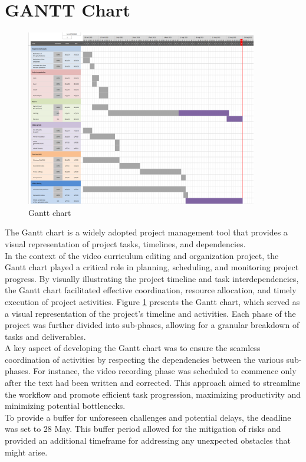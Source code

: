 \documentclass[eng]{class}
\begin{document}
\section{GANTT Chart}
\begin{figure}[b!]
  \centering
  \includegraphics[width=0.9\textwidth]{images/gantt.png}
  \caption{Gantt chart}
  \label{fig-2}
\end{figure}
The Gantt chart is a widely adopted project management tool that provides a visual representation of project tasks, timelines, and dependencies.\\
In the context of the video curriculum editing and organization project, the Gantt chart played a critical role in planning, scheduling,
and monitoring project progress. By visually illustrating the project timeline and task interdependencies, the Gantt chart facilitated effective coordination,
resource allocation, and timely execution of project activities.
Figure \ref{fig-2} presents the  Gantt chart, which served as a visual representation of the project's timeline and activities.
Each phase of the project was further divided into sub-phases, allowing for a granular breakdown of tasks and deliverables.\\
A key aspect of developing the Gantt chart was to ensure the seamless coordination of activities by respecting
the dependencies between the various sub-phases.
For instance, the video recording phase was scheduled to commence only after the text had been written and corrected.
This approach aimed to streamline the workflow and promote efficient task progression, maximizing productivity and minimizing potential bottlenecks.\\
To provide a buffer for unforeseen challenges and potential delays, the deadline was set to 28 May.
This buffer period allowed for the mitigation of risks and provided an additional timeframe for addressing any unexpected obstacles that might arise.\\
\end{document}
